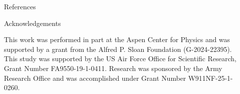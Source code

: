 \documentclass[final]{beamer}
\newlength{\sepwidth}
\newlength{\colwidth}
\newcommand{\separatorcolumn}{\begin{column}{\sepwidth}\end{column}}
\begin{document}
\begin{frame}[t]
\begin{columns}[t]
\begin{column}{\colwidth}
\begin{block}{References}
    \nocite{*}
    \footnotesize{}

  \end{block}

    \begin{block}{Acknowledgements}

    \footnotesize{This work was performed in part at the Aspen Center for Physics and was supported by a grant from the Alfred P. Sloan Foundation (G-2024-22395). This study was supported by the US Air Force Office for Scientific Research, Grant Number FA9550-19-1-0411. Research was sponsored by the Army Research Office and was accomplished under Grant Number W911NF-25-1-0260.}

  \end{block}

\end{column}

\separatorcolumn
\end{columns}
\end{frame}
\end{document}
